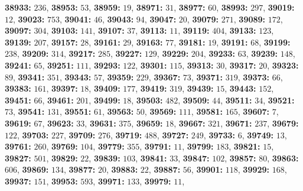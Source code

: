 \textsf{\bfseries 38933:} $236$, \textsf{\bfseries 38953:} $53$, \textsf{\bfseries 38959:} $19$, \textsf{\bfseries 38971:} $31$, \textsf{\bfseries 38977:} $60$, \textsf{\bfseries 38993:} $297$, \textsf{\bfseries 39019:} $12$, \textsf{\bfseries 39023:} $753$, \textsf{\bfseries 39041:} $46$, \textsf{\bfseries 39043:} $94$, \textsf{\bfseries 39047:} $20$, \textsf{\bfseries 39079:} $271$, \textsf{\bfseries 39089:} $172$, \textsf{\bfseries 39097:} $304$, \textsf{\bfseries 39103:} $141$, \textsf{\bfseries 39107:} $37$, \textsf{\bfseries 39113:} $11$, \textsf{\bfseries 39119:} $404$, \textsf{\bfseries 39133:} $123$, \textsf{\bfseries 39139:} $207$, \textsf{\bfseries 39157:} $28$, \textsf{\bfseries 39161:} $29$, \textsf{\bfseries 39163:} $77$, \textsf{\bfseries 39181:} $19$, \textsf{\bfseries 39191:} $68$, \textsf{\bfseries 39199:} $238$, \textsf{\bfseries 39209:} $314$, \textsf{\bfseries 39217:} $285$, \textsf{\bfseries 39227:} $129$, \textsf{\bfseries 39229:} $204$, \textsf{\bfseries 39233:} $63$, \textsf{\bfseries 39239:} $148$, \textsf{\bfseries 39241:} $65$, \textsf{\bfseries 39251:} $111$, \textsf{\bfseries 39293:} $122$, \textsf{\bfseries 39301:} $115$, \textsf{\bfseries 39313:} $30$, \textsf{\bfseries 39317:} $20$, \textsf{\bfseries 39323:} $89$, \textsf{\bfseries 39341:} $351$, \textsf{\bfseries 39343:} $57$, \textsf{\bfseries 39359:} $229$, \textsf{\bfseries 39367:} $73$, \textsf{\bfseries 39371:} $319$, \textsf{\bfseries 39373:} $66$, \textsf{\bfseries 39383:} $161$, \textsf{\bfseries 39397:} $18$, \textsf{\bfseries 39409:} $177$, \textsf{\bfseries 39419:} $319$, \textsf{\bfseries 39439:} $15$, \textsf{\bfseries 39443:} $152$, \textsf{\bfseries 39451:} $66$, \textsf{\bfseries 39461:} $201$, \textsf{\bfseries 39499:} $18$, \textsf{\bfseries 39503:} $482$, \textsf{\bfseries 39509:} $44$, \textsf{\bfseries 39511:} $34$, \textsf{\bfseries 39521:} $73$, \textsf{\bfseries 39541:} $131$, \textsf{\bfseries 39551:} $61$, \textsf{\bfseries 39563:} $50$, \textsf{\bfseries 39569:} $111$, \textsf{\bfseries 39581:} $165$, \textsf{\bfseries 39607:} $7$, \textsf{\bfseries 39619:} $67$, \textsf{\bfseries 39623:} $33$, \textsf{\bfseries 39631:} $375$, \textsf{\bfseries 39659:} $18$, \textsf{\bfseries 39667:} $321$, \textsf{\bfseries 39671:} $237$, \textsf{\bfseries 39679:} $122$, \textsf{\bfseries 39703:} $227$, \textsf{\bfseries 39709:} $276$, \textsf{\bfseries 39719:} $488$, \textsf{\bfseries 39727:} $249$, \textsf{\bfseries 39733:} $6$, \textsf{\bfseries 39749:} $13$, \textsf{\bfseries 39761:} $260$, \textsf{\bfseries 39769:} $104$, \textsf{\bfseries 39779:} $355$, \textsf{\bfseries 39791:} $11$, \textsf{\bfseries 39799:} $183$, \textsf{\bfseries 39821:} $15$, \textsf{\bfseries 39827:} $501$, \textsf{\bfseries 39829:} $22$, \textsf{\bfseries 39839:} $103$, \textsf{\bfseries 39841:} $33$, \textsf{\bfseries 39847:} $102$, \textsf{\bfseries 39857:} $80$, \textsf{\bfseries 39863:} $606$, \textsf{\bfseries 39869:} $134$, \textsf{\bfseries 39877:} $20$, \textsf{\bfseries 39883:} $22$, \textsf{\bfseries 39887:} $56$, \textsf{\bfseries 39901:} $118$, \textsf{\bfseries 39929:} $168$, \textsf{\bfseries 39937:} $151$, \textsf{\bfseries 39953:} $593$, \textsf{\bfseries 39971:} $133$, \textsf{\bfseries 39979:} $11$, 
